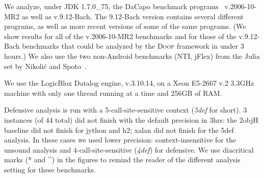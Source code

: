 We analyze, under JDK 1.7.0\_75, the DaCapo benchmark
programs~\cite{oopsla:2006:Blackburn} v.2006-10-MR2 as well as v.9.12-Bach.
The
9.12-Bach version contains several different programs, as well as
more recent versions of some of the same programs.
(We show results for 
all of the v.2006-10-MR2 benchmarks and for those of the v.9.12-Bach 
benchmarks
that could be analyzed by the \textsc{Doop} framework in under 3
hours.)  We also use the two non-Android benchmarks (NTI, jFlex) from the Julia set by
Nikoli\'{c} and Spoto~\cite{ictac:2012:Nikolic}.

We use the LogicBlox Datalog engine, v.3.10.14, on a Xeon E5-2667 v.2
3.3GHz machine with only one thread running at a time and 256GB of RAM.

Defensive analysis is run with a 5-call-site-sensitive context
(\emph{5def} for short).  3 instances (of 44 total) did not finish
with the default precision in 3hrs: the 2objH baseline did not finish
for jython and h2; xalan did not finish for the 5def analysis. In these
cases we used lower precision: context-insensitive for the unsound analysis
and 4-call-site-sensitive (\emph{4def}) for defensive. We use diacritical
marks (* and \^{}) in the figures to remind the reader of the different
analysis setting for these benchmarks.



